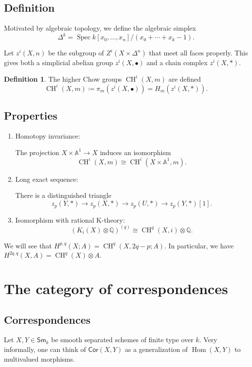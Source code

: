 \documentclass[leqno, openany]{memoir}
\theoremstyle{definition}
\newtheorem{defn}[thm]{Definition}
\theoremstyle{remark}
\theoremstyle{plain}
\theoremstyle{definition}
\theoremstyle{remark}
\newcommand{\A}{\mathbb{A}}
\newcommand{\Q}{\mathbb{Q}}
\newcommand{\Sm}{\mathsf{Sm}}
\newcommand{\Cor}{\mathsf{Cor}}
\DeclareMathOperator{\Hom}{Hom}
\DeclareMathOperator{\Spec}{Spec}
\DeclareMathOperator{\CH}{CH}
\begin{document}
\subsection{Definition}

Motivated by algebraic topology, we define the algebraic simplex \[ \Delta^k =
\Spec k[x_0, \ldots, x_n]/(x_0+\cdots +x_k-1).  \] 

Let $z^i(X, n)$ be the subgroup of $Z^i(X\times \Delta^n)$ that meet all faces
properly.   This gives both a simplicial abelian group $z^i(X, \bullet)$ and a
chain complex $z^i(X, *)$.  

\begin{defn} The higher Chow groups $\CH^i(X, m)$ are defined \[ \CH^i(X,
m)\coloneqq\pi_m(z^i(X, \bullet))=H_m(z^i(X, *)).  \] \end{defn}


\subsection{Properties}

\begin{enumerate} \item Homotopy invariance: 

The projection $X\times \A^1\rightarrow X$ induces an isomorphism \[ \CH^i(X,
m)\cong \CH^i(X\times \A^1, m).  \] 

\item Long exact sequence: 

There is a distinguished triangle \[ z_p(Y, *)\rightarrow z_p(X, *)\rightarrow
z_p(U, *)\rightarrow z_p(Y, *)[1].  \]

\item Isomorphism with rational K-theory: \[ (K_i(X)\otimes \Q)^{(q)}\cong
\CH^q(X, i)\otimes \Q.  \] \end{enumerate}

We will see that $H^{p, q}(X; A)=\CH^q(X, 2q-p; A)$.  In particular, we have
$H^{2q, q}(X, A)=\CH^q(X)\otimes A$. 



\section{The category of correspondences} \subsection{Correspondences} Let $X,
Y\in \Sm_k$ be smooth separated schemes of finite type over $k$.  Very
informally, one can think of $\Cor(X, Y)$ as a generalization of $\Hom(X, Y)$
to multivalued morphisms. 
\end{document}
